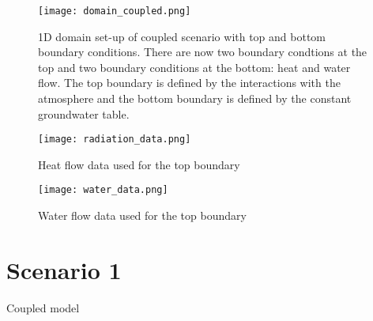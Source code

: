 \documentclass[
10pt, %
a4paper, %
oneside, %
headinclude,footinclude, %
BCOR5mm, %
]{scrartcl}
\begin{document}
\begin{figure}[!h]
\centering
\texttt{[image: domain\_coupled.png]}
\caption{1D domain set-up of coupled scenario with top and bottom boundary conditions. There are now two boundary condtions at the top and two boundary conditions at the bottom: heat and water flow. The top boundary is defined by the interactions with the atmosphere and the bottom boundary is defined by the constant groundwater table.}
\end{figure}


\begin{figure}[!h]
\centering
\texttt{[image: radiation\_data.png]}
\caption{Heat flow data used for the top boundary}
\end{figure}

\begin{figure}[!h]
\centering
\texttt{[image: water\_data.png]}
\caption{Water flow data used for the top boundary}
\end{figure}
\newpage

\section*{Scenario 1}

Coupled model
\end{document}
